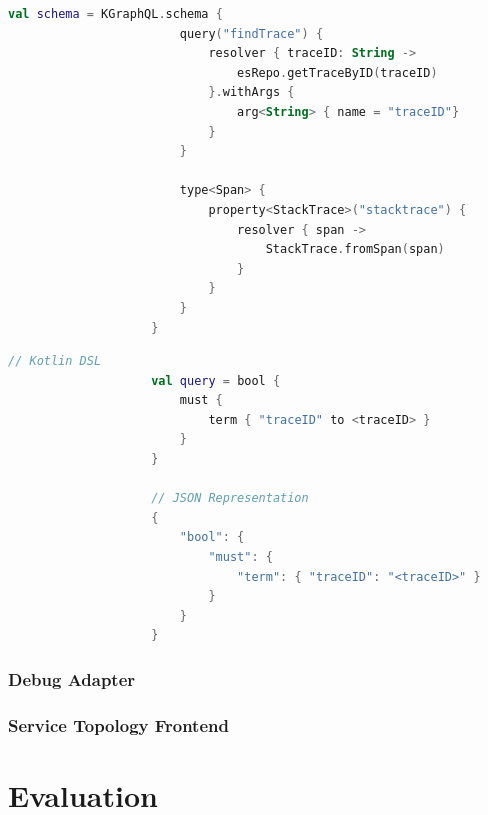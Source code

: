 \documentclass[12pt,pdftex,titlepage]{report}
\begin{document}
                \begin{lstlisting}[caption=Kotlin snippet of defining the GraphQL schema using the Kotlin DSL., language=Kotlin, gobble=20]
                    val schema = KGraphQL.schema { 
                        query("findTrace") { 
                            resolver { traceID: String ->
                                esRepo.getTraceByID(traceID)
                            }.withArgs { 
                                arg<String> { name = "traceID"}
                            }
                        }

                        type<Span> {
                            property<StackTrace>("stacktrace") { 
                                resolver { span ->
                                    StackTrace.fromSpan(span)
                                }
                            }
                        }
                    }                
                \end{lstlisting}

                \begin{lstlisting}[caption={Comparison between Elasticsearch query using Kotlin DSL and the query in its JSON representation, where $\langle$traceID$\rangle$ refers
                    to a variable storing the trace identifier.}, language=Kotlin, gobble=20]
                    // Kotlin DSL
                    val query = bool {
                        must {
                            term { "traceID" to <traceID> }
                        }
                    }

                    // JSON Representation
                    {
                        "bool": {
                            "must": {
                                "term": { "traceID": "<traceID>" }
                            }
                        }
                    }
                \end{lstlisting}
            \subsection{Debug Adapter}
            \subsection{Service Topology Frontend}
            

    \chapter{Evaluation}
\end{document}
